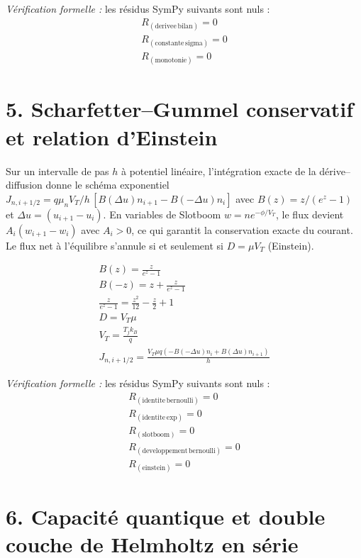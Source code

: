 \documentclass[11pt,a4paper,french]{article}
\begin{document}
\noindent\emph{Vérification formelle :} les résidus SymPy suivants sont nuls :
\begin{align}
R_{(\mathrm{derivee\, bilan})} = 0 \\
R_{(\mathrm{constante\, sigma})} = 0 \\
R_{(\mathrm{monotonie})} = 0
\end{align}

\section{5. Scharfetter--Gummel conservatif et relation d'Einstein}

Sur un intervalle de pas $h$ à potentiel linéaire, l'intégration exacte de la dérive--diffusion donne le schéma exponentiel $J_{n,i+1/2}=q\mu_nV_T/h\,[B(\Delta u)n_{i+1}-B(-\Delta u)n_i]$ avec $B(z)=z/(e^z-1)$ et $\Delta u=(u_{i+1}-u_i)$. En variables de Slotboom $w=ne^{-\phi/V_T}$, le flux devient $A_i(w_{i+1}-w_i)$ avec $A_i>0$, ce qui garantit la conservation exacte du courant. Le flux net à l'équilibre s'annule si et seulement si $D=\mu V_T$ (Einstein).

\begin{align}
B(z) = \frac{z}{e^{z} - 1} \\
B(-z) = z + \frac{z}{e^{z} - 1} \\
\frac{z}{e^{z} - 1} = \frac{z^{2}}{12} - \frac{z}{2} + 1 \\
D = V_T \mu \\
V_T = \frac{T_j k_B}{q} \\
J_{n,i+1/2} = \frac{V_T \mu q \left(- B(-\Delta u) n_i + B(\Delta u) n_{i+1}\right)}{h}
\end{align}

\noindent\emph{Vérification formelle :} les résidus SymPy suivants sont nuls :
\begin{align}
R_{(\mathrm{identite\, bernoulli})} = 0 \\
R_{(\mathrm{identite\, exp})} = 0 \\
R_{(\mathrm{slotboom})} = 0 \\
R_{(\mathrm{developpement\, bernoulli})} = 0 \\
R_{(\mathrm{einstein})} = 0
\end{align}

\section{6. Capacité quantique et double couche de Helmholtz en série}
\end{document}
